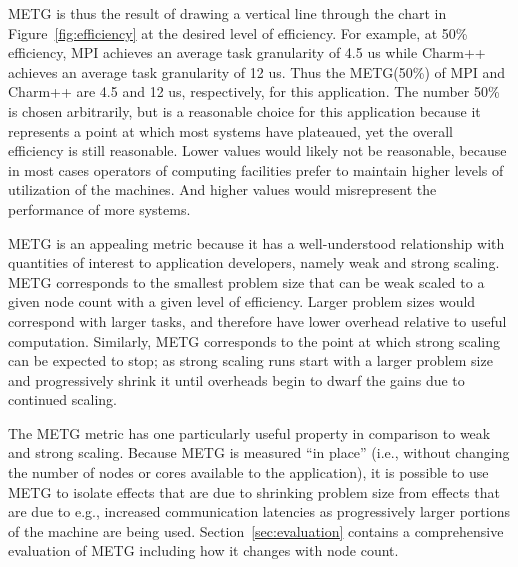 METG is thus the result of drawing a vertical line through the chart
in Figure~\ref{fig:efficiency} at the desired level of efficiency. For
example, at 50\% efficiency, MPI achieves an average task granularity
of 4.5 us while Charm++ achieves an average task granularity of 12
us. Thus the METG(50\%) of MPI and Charm++ are 4.5 and 12 us,
respectively, for this application. The number 50\% is chosen
arbitrarily, but is a reasonable choice for this application because
it represents a point at which most systems have plateaued, yet the
overall efficiency is still reasonable. Lower values would likely not
be reasonable, because in most cases operators of computing facilities
prefer to maintain higher levels of utilization of the machines. And
higher values would misrepresent the performance of more systems.

METG is an appealing metric because it has a well-understood
relationship with quantities of interest to application developers,
namely weak and strong scaling. METG corresponds to the smallest
problem size that can be weak scaled to a given node count with a
given level of efficiency. Larger problem sizes would correspond with
larger tasks, and therefore have lower overhead relative to useful
computation. Similarly, METG corresponds to the point at which strong
scaling can be expected to stop; as strong scaling runs start with a
larger problem size and progressively shrink it until overheads begin
to dwarf the gains due to continued scaling.

The METG metric has one particularly useful property in comparison to
weak and strong scaling. Because METG is measured ``in place'' (i.e.,
without changing the number of nodes or cores available to the
application), it is possible to use METG to isolate effects that are
due to shrinking problem size from effects that are due to e.g.,
increased communication latencies as progressively larger portions of
the machine are being used. Section~\ref{sec:evaluation} contains a
comprehensive evaluation of METG including how it changes with node
count.

